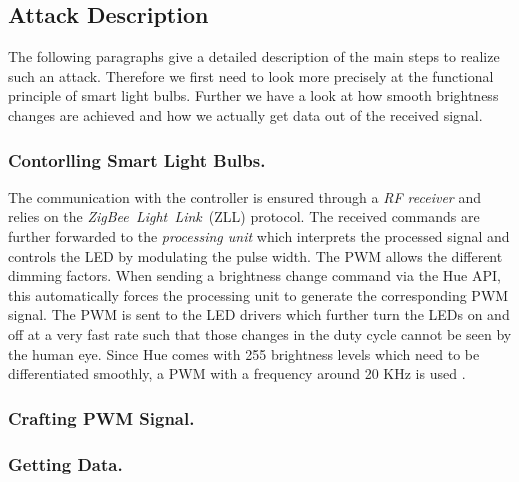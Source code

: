 \subsection{Attack Description}
\label{sec:exp:description}


The following paragraphs give a detailed description of the main steps to realize such an attack. Therefore we first need to look more precisely at the functional principle of smart light bulbs. Further we have a look at how smooth brightness changes are achieved and how we actually get data out of the received signal.\newline



\subsubsection{Contorlling Smart Light Bulbs.} 
The communication with the controller is ensured through a \textit{RF receiver} and relies on the \textit{ZigBee~Light~Link}~(ZLL) protocol. The received commands are further forwarded to the \textit{processing unit} which interprets the processed signal and controls the LED by modulating the pulse width. The PWM allows the different dimming factors. When sending a brightness change command via the Hue API, this automatically forces the processing unit to generate the corresponding PWM signal. The PWM is sent to the LED drivers which further turn the LEDs on and off at a very fast rate such that those changes in the duty cycle cannot be seen by the human eye. Since Hue comes with 255 brightness levels which need to be differentiated smoothly, a PWM with a frequency around 20 KHz is used \cite{Ronen:2016:EFAIDCSL}. 

\subsubsection{Crafting PWM Signal.}

\subsubsection{Getting Data.}
